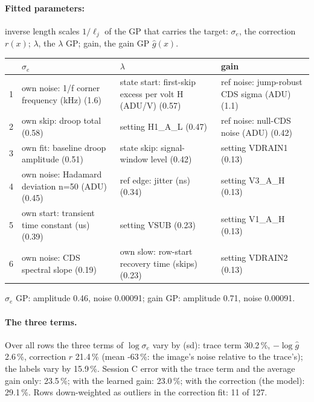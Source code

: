 \paragraph{Fitted parameters:} inverse length scales $1/\ell_j$ of the GP that carries the target: $\sigma_e$, the correction $r(x)$; $\lambda$, the $\lambda$ GP; gain, the gain GP $\hat g(x)$.
\begin{center}\footnotesize
\begin{tabular}{rp{}p{}p{}}
\toprule
 & $\sigma_e$ & $\lambda$ & gain \\
\midrule
1 & own noise: 1/f corner frequency (kHz) (1.6) & state start: first-skip excess per volt H (ADU/V) (0.57) & ref noise: jump-robust CDS sigma (ADU) (1.1) \\
2 & own skip: droop total (0.58) & setting H1\_A\_L (0.47) & ref noise: null-CDS noise (ADU) (0.42) \\
3 & own fit: baseline droop amplitude (0.51) & state skip: signal-window level (0.42) & setting VDRAIN1 (0.13) \\
4 & own noise: Hadamard deviation n=50 (ADU) (0.45) & ref edge: jitter (ns) (0.34) & setting V3\_A\_H (0.13) \\
5 & own start: transient time constant (us) (0.39) & setting VSUB (0.23) & setting V1\_A\_H (0.13) \\
6 & own noise: CDS spectral slope (0.19) & own slow: row-start recovery time (skips) (0.23) & setting VDRAIN2 (0.13) \\
\bottomrule
\end{tabular}
\end{center}
{\footnotesize $\sigma_e$ GP: amplitude 0.46, noise 0.00091; gain GP: amplitude 0.71, noise 0.00091.}
\paragraph{The three terms.}
Over all rows the three terms of $\log\sigma_e$ vary by (sd): trace term 30.2\,\%, $-\log\hat g$ 2.6\,\%, correction $r$ 21.4\,\% (mean -63\,\%: the image's noise relative to the trace's); the labels vary by 15.9\,\%. Session C error with the trace term and the average gain only: 23.5\,\%; with the learned gain: 23.0\,\%; with the correction (the model): 29.1\,\%. Rows down-weighted as outliers in the correction fit: 11 of 127.
